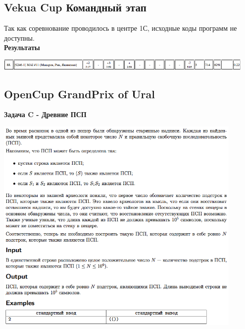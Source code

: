 \documentclass[a4paper,12pt]{article}
\begin{document}
\subsection{Vekua Cup Командный этап}

Так как соревнование проводилось в центре 1С, исходные коды программ не доступны. \\

\textbf{{\large Результаты}} \\
\begin{center}
\includegraphics[width=0.95\textwidth]{Vekua_team/Vekua_team_result.png}\\ [1cm]
\end{center}



%
%
\newpage
\subsection{OpenCup GrandPrix of Ural}

\textbf{{\large Задача C - Древние ПСП}} \\
\begin{center}
\includegraphics[width=0.9\textwidth]{OC_Ural/OC_Ural_C.png}\\ [1cm]
\end{center}
\newpage
\end{document}
